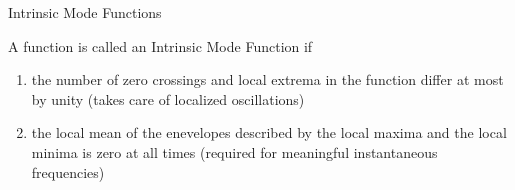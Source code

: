 \documentclass[xcolor=dvipsnames]{beamer}
\begin{document}
\begin{frame}{Intrinsic Mode Functions}
\begin{definition}
A function is called an Intrinsic Mode Function if

\begin{enumerate}
\item the number of zero crossings and local extrema in the function differ at most by unity (takes care of localized oscillations)
\item the local mean of the enevelopes described by the local maxima and the local minima is zero at all times (required for meaningful instantaneous frequencies)
\end{enumerate}
\end{definition}

\end{frame}
\end{document}
